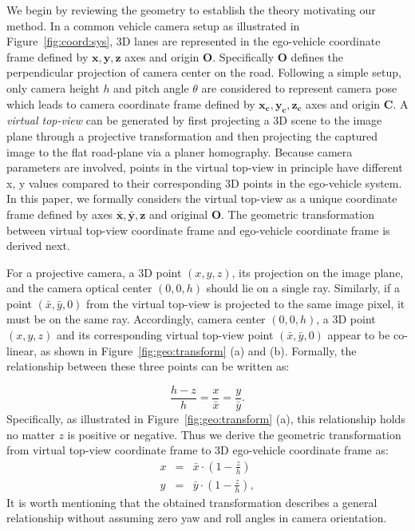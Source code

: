 \documentclass[10pt,twocolumn,letterpaper]{article}
\begin{document}
We begin by reviewing the geometry to establish the theory motivating our method. In a common vehicle camera setup as illustrated in Figure~\ref{fig:coord:sys},
3D lanes are represented in the ego-vehicle coordinate frame defined by $\boldsymbol{x}, \boldsymbol{y}, \boldsymbol{z}$ axes and origin $\boldsymbol{O}$. Specifically $\boldsymbol{O}$ defines the perpendicular projection of camera center on the road. Following a simple setup, only camera height $h$ and pitch angle $\theta$ are considered to represent camera pose which leads to camera coordinate frame defined by $\boldsymbol{x_c}, \boldsymbol{y_c}, \boldsymbol{z_c}$ axes and origin $\boldsymbol{C}$. 
A \textit{virtual top-view} can be generated by first projecting a 3D scene to the image plane through a projective transformation and then projecting the captured image to the flat road-plane via a planer homography. Because camera parameters are involved, points in the virtual top-view in principle have different x, y values compared to their corresponding 3D points in the ego-vehicle system. In this paper, we formally considers the virtual top-view as a unique coordinate frame defined by axes $\boldsymbol{\bar{x}}, \boldsymbol{\bar{y}}, \boldsymbol{z}$ and original \textbf{O}. The geometric transformation between virtual top-view coordinate frame and ego-vehicle coordinate frame is derived next.









For a projective camera, a 3D point $(x, y, z)$, its projection on the image plane, and the camera optical center $(0, 0, h)$ should lie on a single ray. Similarly, if a point $(\bar{x}, \bar{y}, 0)$ from the virtual top-view is projected to the same image pixel, it must be on the same ray. Accordingly, camera center $(0, 0, h)$, a 3D point $(x, y, z)$ and its corresponding virtual top-view point $(\bar{x}, \bar{y}, 0)$ appear to be co-linear, as shown in Figure~\ref{fig:geo:transform} (a) and (b). Formally, the relationship between these three points can be written as:




\begin{equation}
    \frac{h-z}{h} = \frac{x}{\bar{x}} = \frac{y}{\bar{y}}.
\end{equation}
Specifically, as illustrated in Figure~\ref{fig:geo:transform} (a), this relationship holds no matter $z$ is positive or negative. Thus we derive the geometric transformation from virtual top-view coordinate frame to 3D ego-vehicle coordinate frame as:
\begin{eqnarray}
    \label{eqn:sim_geo}
        x &=& \bar{x} \cdot (1 - \frac{z}{h})\nonumber\\ 
        y &=& \bar{y} \cdot (1 - \frac{z}{h}),
\end{eqnarray}
It is worth mentioning that the obtained transformation describes a general relationship without assuming zero yaw and roll angles in camera orientation. 
\end{document}
